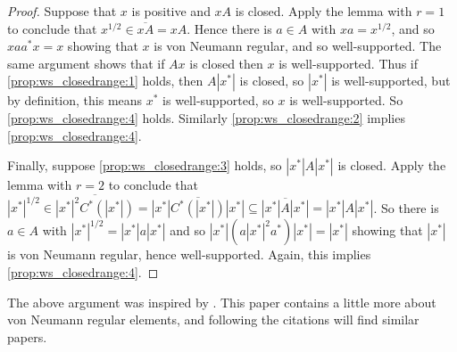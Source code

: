 \documentclass[twoside,a4paper,12pt]{article}
\theoremstyle{plain}
\theoremstyle{definition}
\begin{document}
\begin{proof}
Suppose that $x$ is positive and $xA$ is closed.  Apply the lemma with $r=1$ to conclude that $x^{1/2} \in \overline{xA} = xA$.
Hence there is $a\in A$ with $xa = x^{1/2}$, and so $xaa^*x = x$ showing that $x$ is von Neumann regular, and so well-supported.  The same argument shows that if $Ax$ is closed then $x$ is well-supported.
Thus if \ref{prop:ws_closedrange:1} holds, then $A|x^*|$ is closed, so $|x^*|$ is well-supported, but by definition, this means $x^*$ is well-supported, so $x$ is well-supported.  So \ref{prop:ws_closedrange:4} holds.  Similarly \ref{prop:ws_closedrange:2} implies \ref{prop:ws_closedrange:4}.

Finally, suppose \ref{prop:ws_closedrange:3} holds, so $|x^*|A|x^*|$ is closed.
Apply the lemma with $r=2$ to conclude that $|x^*|^{1/2} \in \overline{|x^*|^2 C^*(|x^*|)} = \overline{|x^*| C^*(|x^*|) |x^*|} \subseteq \overline{|x^*|A|x^*|} = |x^*|A|x^*|$.  So there is $a\in A$ with $|x^*|^{1/2} = |x^*| a |x^*|$ and so $|x^*| (a |x^*|^2 a^*) |x^*| = |x^*|$ showing that $|x^*|$ is von Neumann regular, hence well-supported.  Again, this implies \ref{prop:ws_closedrange:4}.
\end{proof}

The above argument was inspired by \cite[Theorem~8]{hm}.  This paper \cite{hm} contains a little more about von Neumann regular elements, and following the citations will find similar papers.
\end{document}
